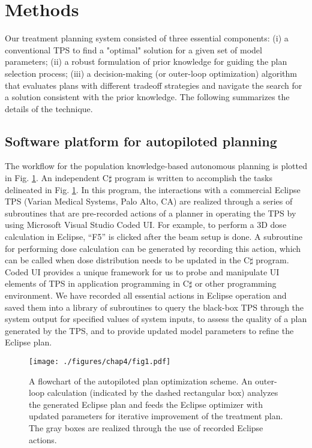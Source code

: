 \section{Methods}
 Our treatment planning system consisted of three essential components: (i) a conventional TPS to find a "optimal" solution for a given set of model parameters; (ii) a robust formulation of prior knowledge for guiding the plan selection process; (iii) a decision-making (or outer-loop optimization) algorithm that evaluates plans with different tradeoff strategies and navigate the search for a solution consistent with the prior knowledge. The following summarizes the details of the technique. 
 
 \subsection{Software platform for autopiloted planning}
The workflow for the population knowledge-based autonomous planning is plotted in Fig. \ref{fig4.1}. An independent C$\sharp$ program is written to accomplish the tasks delineated in Fig. \ref{fig4.1}. In this program, the interactions with a commercial Eclipse TPS (Varian Medical Systems, Palo Alto, CA) are realized through a series of subroutines that are pre-recorded actions of a planner in operating the TPS by using Microsoft Visual Studio Coded UI\cite{johnson2015,website2015}. For example, to perform a 3D dose calculation in Eclipse, ``F5'' is clicked after the beam setup is done. A subroutine for performing dose calculation can be generated by recording this action, which can be called when dose distribution needs to be updated in the C$\sharp$ program. Coded UI provides a unique framework for us to probe and manipulate UI elements of TPS in application programming in C$\sharp$ or other programming environment. We have recorded all essential actions in Eclipse operation and saved them into a library of subroutines to query the black-box TPS through the system output for specified values of system inputs, to assess the quality of a plan generated by the TPS, and to provide updated model parameters to refine the Eclipse plan.

\begin{figure}
	\centering
	\texttt{[image: ./figures/chap4/fig1.pdf]}
	\caption{A flowchart of the autopiloted plan optimization scheme. An outer-loop calculation (indicated by the dashed rectangular box) analyzes the generated Eclipse plan and feeds the Eclipse optimizer with updated parameters for iterative improvement of the treatment plan. The gray boxes are realized through the use of recorded Eclipse actions. 
	\label{fig4.1}}
    \end{figure}

